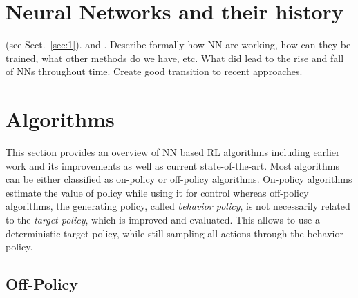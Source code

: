     \section{Neural Networks and their history}
    \label{sec:def}
    (see Sect.~\ref{sec:1}).
    \cite{RefB} and \cite{RefJ}.
    Describe formally how NN are working, how can they be trained, what other methods do we have, etc.
    What did lead to the rise and fall of NNs throughout time.
    Create good transition to recent approaches.

    \section{Algorithms}
	    \label{sec:algo}
	    This section provides an overview of NN based RL algorithms including earlier work and its improvements as well as current state-of-the-art. 
	    Most algorithms can be either classified as on-policy or off-policy algorithms.
		On-policy algorithms estimate the value of policy while using it for control whereas off-policy algorithms, the generating policy, called \textit{behavior policy}, is not necessarily related to the \textit{target policy}, which is improved and evaluated.
		This allows to use a deterministic target policy, while still sampling all actions through the behavior policy. \cite[chapter 5]{Sutton2018}
		
 	\subsection{Off-Policy}
